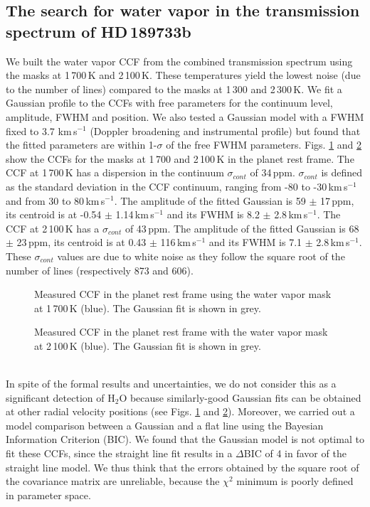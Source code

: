 \documentclass{aa}
\begin{document}
	\subsection{The search for water vapor in the transmission spectrum of HD\,189733b}
	\label{result water ccf}
We built the water vapor CCF from the combined transmission spectrum using the masks at 1\,700\,K and 2\,100\,K. These temperatures yield the lowest noise (due to the number of lines) compared to the masks at 1\,300 and 2\,300\,K. We fit a Gaussian profile to the CCFs with free parameters for the continuum level, amplitude, FWHM and position. We also tested a Gaussian model with a FWHM fixed to 3.7 km\,s$^{-1}$ (Doppler broadening and instrumental profile) but found that the fitted parameters are within 1-$\sigma$ of the free FWHM parameters. Figs. \ref{CCF eau 1700K planet base} and \ref{CCF eau 2100K planet base} show the CCFs for the masks at 1\,700 and 2\,100\,K in the planet rest frame. The CCF at 1\,700\,K has a dispersion in the continuum $\sigma_{cont}$  of 34\,ppm. $\sigma_{cont}$ is defined as the standard deviation in the CCF continuum, ranging from -80 to -30\,km\,s$^{-1}$ and from 30 to 80\,km\,s$^{-1}$. The amplitude of the fitted Gaussian is 59 $\pm$ 17\,ppm, its centroid is at -0.54 $\pm$ 1.14\,km\,s$^{-1}$ and its FWHM is 8.2 $\pm$ 2.8\,km\,s$^{-1}$. The CCF at 2\,100\,K has a $\sigma_{cont}$ of 43\,ppm. The  amplitude of the fitted Gaussian is 68 $\pm$ 23\,ppm, its centroid is at 0.43 $\pm$ 116\,km\,s$^{-1}$ and its FWHM is 7.1 $\pm$ 2.8\,km\,s$^{-1}$. These $\sigma_{cont}$ values are due to white noise as they follow the square root of the number of lines (respectively 873 and 606).\\
\begin{figure}[h]
\caption[CCF eau 1700K planete base]{Measured CCF in the planet rest frame using the water vapor mask at 1\,700\,K (blue). The Gaussian fit is shown in grey.}
\label{CCF eau 1700K planet base}
\end{figure}
\begin{figure}[h]
\caption[CCF eau 2100K planete base]{Measured CCF in the planet rest frame with the water vapor mask at 2\,100\,K (blue). The Gaussian fit is shown in grey.}
\label{CCF eau 2100K planet base}
\end{figure}\\
In spite of the formal results and uncertainties, we do not consider this as a significant detection of H$_2$O because similarly-good Gaussian fits can be obtained at other radial velocity positions (see Figs. \ref{CCF eau 1700K planet base} and \ref{CCF eau 2100K planet base}). Moreover, we carried out a model comparison between a Gaussian and a flat line using the Bayesian Information Criterion (BIC). We found that the Gaussian model is not optimal to fit these CCFs, since the straight line fit results in a $\Delta$BIC of 4 in favor of the straight line model. We thus think that the errors obtained by the square root of the covariance matrix are unreliable, because the $\chi^2$ minimum is poorly defined in parameter space.
\end{document}
